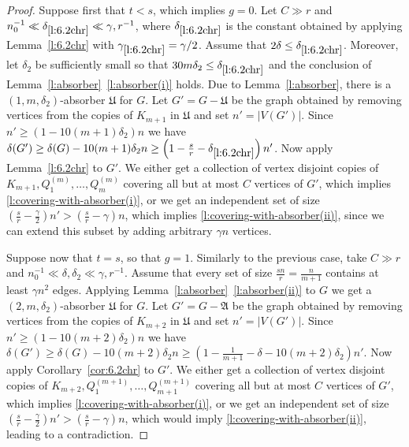 \documentclass[reqno, 12pt]{amsart}
\numberwithin{equation}{section}
\numberwithin{figure}{section}
\theoremstyle{plain}
\theoremstyle{definition}
\def\fA{\mathfrak{A}}
\def\fU{\mathfrak{U}}
\begin{document}
    \begin{proof}
        Suppose first that $t<s$, which implies $g=0$.
        Let $C\gg r$ and $n_0^{-1}\ll \delta_{\ref{l:6.2chr}} \ll \gamma, r^{-1}$, where $\delta_{\ref{l:6.2chr}}$ is the constant obtained by applying Lemma~\ref{l:6.2chr} with $\gamma_{\ref{l:6.2chr}}=\gamma/2$. Assume that $2\delta \leq \delta_{\ref{l:6.2chr} }$. Moreover, let $\delta_2$ be sufficiently small so that $30m\delta_2 \leq \delta_{\ref{l:6.2chr} }$ and the conclusion of Lemma~\ref{l:absorber}~\ref{l:absorber(i)} holds. Due to Lemma~\ref{l:absorber}, there is a $(1,m,\delta_2)$-absorber $\fU$ for $G$. Let $G'=G-\fU$ be the graph obtained by removing vertices from the copies of $K_{m+1}$ in $\fU$ and set $n'=|V(G')|$. Since $n'\geq (1-10(m+1) \delta_2)n$ we have $\delta(G')\geq \delta(G) - 10(m+1) \delta_2 n\geq \left(1- \frac sr - \delta_{\ref{l:6.2chr} } \right)n'$. Now apply Lemma~\ref{l:6.2chr} to $G'$. We either get a collection of vertex disjoint copies of $K_{m+1},Q_1^{(m)},\dots ,Q_m^{(m)}$ covering all but at most $C$ vertices of $G'$, which implies \ref{l:covering-with-absorber(i)}, or we get an independent set of size $\left(\frac sr - \frac \gamma 2\right)n'>\left(\frac sr - \gamma\right)n$, which implies \ref{l:covering-with-absorber(ii)}, since we can extend this subset by adding arbitrary $\gamma n$ vertices.
        
        Suppose now that $t=s$, so that $g=1$.
        Similarly to the previous case, take $C\gg r$ and $n_0^{-1} \ll \delta,\delta_2 \ll \gamma, r^{-1}$. Assume that every set of size $\frac{sn}{r}=\frac{n}{m+1}$ contains at least $\gamma n^2$ edges. Applying Lemma~\ref{l:absorber}~\ref{l:absorber(ii)} to $G$ we get a  $(2,m,\delta_2)$-absorber $\fU$ for $G$. Let $G'=G-\fA$ be the graph obtained by removing vertices from the copies of $K_{m+2}$ in $\fU$ and set $n'=|V(G')|$. Since $n'\geq (1-10(m+2)\delta_2)n$ we have $\delta(G')\geq \delta(G) - 10(m+2)\delta_2 n\geq \left(1- \frac {1}{m+1} - \delta-10(m+2)\delta_2\right)n'$. Now apply Corollary~\ref{cor:6.2chr} to $G'$. We either get a collection of vertex disjoint copies of $K_{m+2},Q_1^{(m+1)},\dots ,Q_{m+1}^{(m+1)}$ covering all but at most $C$ vertices of $G'$, which implies \ref{l:covering-with-absorber(i)}, or we get an independent set of size $\left(\frac sr - \frac \gamma 2\right)n'>\left(\frac sr - \gamma\right)n$, which would imply \ref{l:covering-with-absorber(ii)}, leading to a contradiction.
    \end{proof}

    
\end{document}
